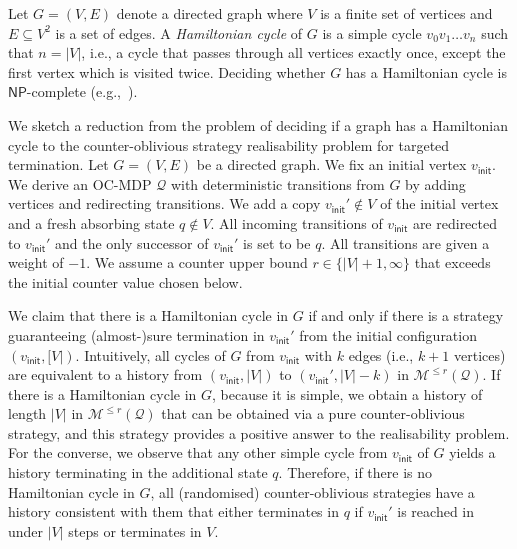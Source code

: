 \documentclass[a4paper,UKenglish,cleveref,autoref,thm-restate,colorlinks]{lipics-v2021}
\newcommand{\init}{\mathsf{init}}
\newcommand{\np}{\textsf{NP}}
\newcommand{\graph}{G}
\newcommand{\vertexSet}{V}
\newcommand{\vertex}{v}
\newcommand{\edgeSet}{E}
\newcommand{\mdp}{\mathcal{M}}
\newcommand{\indexLast}{n}
\newcommand{\ocmdp}{\mathcal{Q}}
\newcommand{\ocmdpFin}[2]{\mdp^{\leq #2}(#1)}
\newcommand{\ocState}{q}
\newcommand{\ocCount}{k}
\newcommand{\counterUB}{r}
\begin{document}
Let $\graph = (\vertexSet, \edgeSet)$ denote a directed graph where $\vertexSet$ is a finite set of vertices and $\edgeSet\subseteq\vertexSet^2$ is a set of edges.
A \textit{Hamiltonian cycle} of $\graph$ is a simple cycle $\vertex_0\vertex_1\ldots\vertex_\indexLast$ such that $\indexLast=|\vertexSet|$, i.e., a cycle that passes through all vertices exactly once, except the first vertex which is visited twice.
Deciding whether $\graph$ has a Hamiltonian cycle is $\np{}$-complete (e.g.,~\cite{DBLP:books/fm/GareyJ79}).

We sketch a reduction from the problem of deciding if a graph has a Hamiltonian cycle to the counter-oblivious strategy realisability problem for targeted termination.
Let $\graph = (\vertexSet, \edgeSet)$ be a directed graph.
We fix an initial vertex $\vertex_\init$.
We derive an OC-MDP $\ocmdp$ with deterministic transitions from $\graph$ by adding vertices and redirecting transitions.
We add a copy $\vertex_\init'\notin\vertexSet$ of the initial vertex and a fresh absorbing state $\ocState\notin\vertexSet$.
All incoming transitions of $\vertex_\init$ are redirected to $\vertex_\init'$ and the only successor of $\vertex_\init'$ is set to be $\ocState$.
All transitions are given a weight of $-1$.
We assume a counter upper bound $\counterUB\in\{|\vertexSet|+1, \infty\}$ that exceeds the initial counter value chosen below.

We claim that there is a Hamiltonian cycle in $\graph$ if and only if there is a strategy guaranteeing (almost-)sure termination in $\vertex_\init'$ from the initial configuration $(\vertex_\init, [\vertexSet|)$.
Intuitively, all cycles of $\graph$ from $\vertex_\init$ with $\ocCount$ edges (i.e., $\ocCount+1$ vertices) are equivalent to a history from $(\vertex_\init, |\vertexSet|)$ to $(\vertex_\init', |\vertexSet|-\ocCount)$ in $\ocmdpFin{\ocmdp}{\counterUB}$.
If there is a Hamiltonian cycle in $\graph$, because it is simple, we obtain a history of length $|\vertexSet|$ in $\ocmdpFin{\ocmdp}{\counterUB}$ that can be obtained via a pure counter-oblivious strategy, and this strategy provides a positive answer to the realisability problem.
For the converse, we observe that any other simple cycle from $\vertex_\init$ of $\graph$ yields a history terminating in the additional state $\ocState$.
Therefore, if there is no Hamiltonian cycle in $\graph$, all (randomised) counter-oblivious strategies have a history consistent with them that either terminates in $\ocState$ if $\vertex_\init'$ is reached in under $|\vertexSet|$ steps or terminates in $\vertexSet$.
\end{document}
